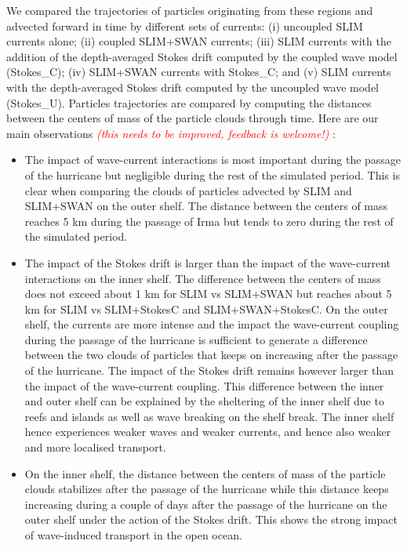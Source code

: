 \documentclass[11pt,a4paper]{article}
\newcommand{\emphc}[1]{\emph{\textcolor{red}{#1}}}
\begin{document}
We compared the trajectories of particles originating from these regions and advected forward in time by different sets of currents: (i) uncoupled SLIM currents alone; (ii) coupled SLIM+SWAN currents; (iii) SLIM currents with the addition of the depth-averaged Stokes drift computed by the coupled wave model (Stokes\_C); (iv) SLIM+SWAN currents with Stokes\_C; and (v) SLIM currents with the depth-averaged Stokes drift computed by the uncoupled wave model (Stokes\_U). Particles trajectories are compared by computing the distances between the centers of mass of the particle clouds through time. Here are our main observations \emphc{(this needs to be improved, feedback is welcome!)} : 
\begin{itemize}
    \item The impact of wave-current interactions is most important during the passage of the hurricane but negligible during the rest of the simulated period. This is clear when comparing the clouds of particles advected by SLIM and SLIM+SWAN on the outer shelf. The distance between the centers of mass reaches 5 km during the passage of Irma but tends to zero during the rest of the simulated period.
    \item The impact of the Stokes drift is larger than the impact of the wave-current interactions on the inner shelf. The difference between the centers of mass does not exceed about 1 km for SLIM vs SLIM+SWAN but reaches about 5 km for SLIM vs SLIM+Stokes\textunderscore C and SLIM+SWAN+Stokes\textunderscore C. On the outer shelf, the currents are more intense and the impact the wave-current coupling during the passage of the hurricane is sufficient to generate a difference between the two clouds of particles that keeps on increasing after the passage of the hurricane. The impact of the Stokes drift remains however larger than the impact of the wave-current coupling. This difference between the inner and outer shelf can be explained by the sheltering of the inner shelf due to reefs and islands as well as wave breaking on the shelf break. The inner shelf hence experiences weaker waves and weaker currents, and hence also weaker and more localised transport. 
    \item On the inner shelf, the distance between the centers of mass of the particle clouds stabilizes after the passage of the hurricane while this distance keeps increasing during a couple of days after the passage of the hurricane on the outer shelf under the action of the Stokes drift. This shows the strong impact of wave-induced transport in the open ocean. 

\end{itemize}
\end{document}
